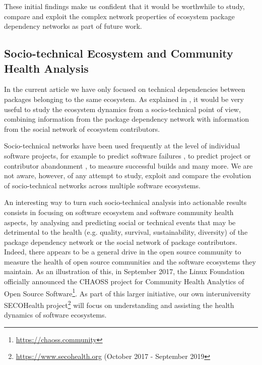 \documentclass[smallextended]{svjour3}       %
\begin{document}
These initial findings make us confident that it would be worthwhile to study, compare and exploit the complex network properties of ecosystem package dependency networks as part of future work.

\subsection{Socio-technical Ecosystem and Community Health Analysis}
\label{sec:social}

In the current article we have only focused on technical dependencies between packages belonging to the same ecosystem.
As explained in \cite{Mens2016keynote}, it would be very useful to study the ecosystem dynamics from a socio-technical point of view, combining information from the package dependency network with information from the social network of ecosystem contributors.

Socio-technical networks have been used frequently at the level of individual software projects, for example to predict software failures \cite{Bird2009,Posnett2013-ICSE}, to predict project or contributor abandonment \cite{Constantinou2017}, to measure successful builds \cite{Kwan2011} and many more. We are not aware, however, of any attempt to study, exploit and compare the evolution of socio-technical networks across multiple software ecosystems.

An interesting way to turn such socio-technical analysis into actionable results consists in focusing on software ecosystem and software community health aspects, by analysing and predicting social or technical events that may be detrimental to the health (e.g. quality, survival, sustainability, diversity) of the package dependency network or the social network of package contributors.
Indeed, there appears to be a general drive in the open source community to measure the health of open source communities and the software ecosystems they maintain. As an illustration of this, in September 2017, the Linux Foundation officially announced the {\textsf CHAOSS} project for Community Health Analytics of Open Source Software\footnote{\url{https://chaoss.community}}.
As part of this larger initiative, our own interuniversity {\textsf SECOHealth} project\footnote{\url{https://www.secohealth.org} (October 2017 - September 2019} will focus on understanding and assisting the health dynamics of software ecosystems.


\end{document}

